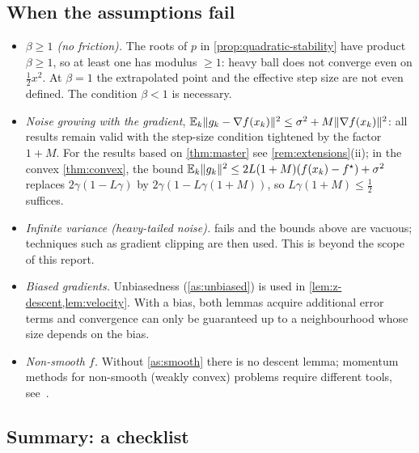 \subsection{When the assumptions fail}

\begin{itemize}
\item \emph{$\beta\ge1$ (no friction).} The roots of $p$ in \cref{prop:quadratic-stability}
  have product $\beta\ge1$, so at least one has modulus $\ge1$: heavy ball does not converge
  even on $\frac12x^2$. At $\beta=1$ the extrapolated point and the effective step size
  are not even defined.
  The condition $\beta<1$ is necessary.
\item \emph{Noise growing with the gradient},
  $\mathbb{E}_k\lVert g_k-\nabla f(x_k)\rVert^2\le\sigma^2+M\lVert \nabla f(x_k)\rVert^2$: all results remain
  valid with the step-size condition tightened by the factor $1+M$. For the results based
  on \cref{thm:master} see \cref{rem:extensions}(ii); in the convex \cref{thm:convex}, the
  bound $\mathbb{E}_k\lVert g_k\rVert^2\le2L(1+M)(f(x_k)-f^\star)+\sigma^2$ replaces $2\gamma(1-L\gamma)$ by
  $2\gamma(1-L\gamma(1+M))$, so $L\gamma(1+M)\le\frac12$ suffices.
\item \emph{Infinite variance (heavy-tailed noise).}  fails and the bounds
  above are vacuous; techniques such as gradient clipping are then used. This is beyond the
  scope of this report.
\item \emph{Biased gradients.} Unbiasedness (\cref{as:unbiased}) is used in
  \cref{lem:z-descent,lem:velocity}. With a bias, both lemmas acquire additional error
  terms and convergence can only be guaranteed up to a neighbourhood whose size depends on
  the bias.
\item \emph{Non-smooth $f$.} Without \cref{as:smooth} there is no descent lemma; momentum
  methods for non-smooth (weakly convex) problems require different tools,
  see~\cite{mai2020}.
\end{itemize}

\subsection{Summary: a checklist}

